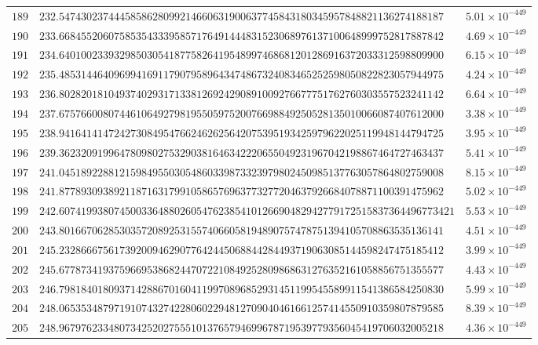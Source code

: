 \documentclass[12pt,reqno]{amsart}
\theoremstyle{remark}
\begin{document}
\begin{longtable}{clc}
$189$ & $232.5474302374445858628099214660631900637745843180345957848821136274188187$ & $5.01\times 10^{-449}$ \\
$190$ & $233.6684552060758535433395857176491444831523068976137100648999752817887842$ & $4.69\times 10^{-449}$ \\
$191$ & $234.6401002339329850305418775826419548997468681201286916372033312598809900$ & $6.15\times 10^{-449}$ \\
$192$ & $235.4853144640969941691179079589643474867324083465252598050822823057944975$ & $4.24\times 10^{-449}$ \\
$193$ & $236.8028201810493740293171338126924290891009276677751762760303557523241142$ & $6.64\times 10^{-449}$ \\
$194$ & $237.6757660080744610649279819550597520076698849250528135010066087407612000$ & $3.38\times 10^{-449}$ \\
$195$ & $238.9416414147242730849547662462625642075395193425979622025119948144794725$ & $3.95\times 10^{-449}$ \\
$196$ & $239.3623209199647809802753290381646342220655049231967042198867464727463437$ & $5.41\times 10^{-449}$ \\
$197$ & $241.0451892288121598495503054860339873323979802450985137763057864802759008$ & $8.15\times 10^{-449}$ \\
$198$ & $241.8778930938921187163179910586576963773277204637926684078871100391475962$ & $5.02\times 10^{-449}$ \\
$199$ & $242.607419938074500336488026054762385410126690482942779172515837364496773421$ & $5.53\times 10^{-449}$ \\
$200$ & $243.8016670628530357208925315574066058194890757478751394105708863535136141$ & $4.51\times 10^{-449}$ \\
$201$ & $245.2328666756173920094629077642445068844284493719063085144598247475185412$ & $3.99\times 10^{-449}$ \\
$202$ & $245.6778734193759669538682447072210849252809868631276352161058856751355577$ & $4.43\times 10^{-449}$ \\
$203$ & $246.7981840180937142886701604119970896852931451199545589911541386584250830$ & $5.99\times 10^{-449}$ \\
$204$ & $248.0653534879719107432742280602294812709040461661257414550910359807879585$ & $8.39\times 10^{-449}$ \\
$205$ & $248.9679762334807342520275551013765794699678719539779356045419706032005218$ & $4.36\times 10^{-449}$ \\

\end{longtable}
\end{document}
